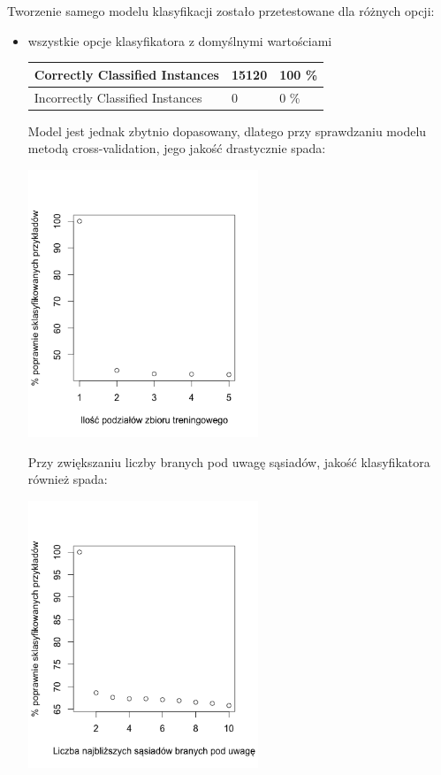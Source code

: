 \documentclass[11pt]{article} %
\begin{document}
Tworzenie samego modelu klasyfikacji zostało przetestowane dla różnych opcji:
\begin{itemize}
\item wszystkie opcje klasyfikatora z domyślnymi wartościami

\begin{center}
    \begin{tabular}{ | l | l | l | }
    \hline
    	Correctly Classified Instances & 15120 & 100 \% \\ \hline
	Incorrectly Classified Instances & 0 & 0 \% \\ \hline
    \end{tabular}
\end{center}

Model jest jednak zbytnio dopasowany, dlatego przy sprawdzaniu modelu metodą cross-validation, jego jakość drastycznie spada:

\begin{center}
	\includegraphics[height=8cm]{knn-cross-validation}
\end{center}

Przy zwiększaniu liczby branych pod uwagę sąsiadów, jakość klasyfikatora również spada:

\begin{center}
	\includegraphics[height=8cm]{knn-neighbours}
\end{center}

\end{itemize}
\end{document}
